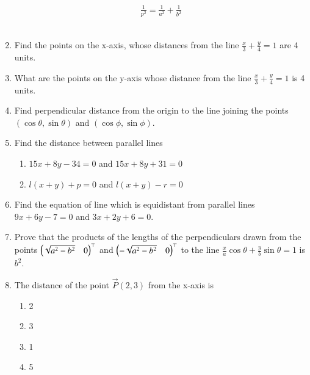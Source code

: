 \begin{enumerate}[label=\thesubsection.\arabic*,ref=\thesubsection.\theenumi]
\begin{align}
	\frac{1}{p^2} = \frac{1}{a^2}+ \frac{1}{b^2}
\label{eq:11/10/3/18}
\end{align}
\label{chapters/11/10/3/18}
\\
\solution

\item Find the points on the x-axis, whose distances from the line $\frac{x}{3}+\frac{y}{4}=1$ are 4 units.
\label{chapters/11/10/3/5}
	\\
	\solution

\item What are the points on the y-axis whose distance from the line $\frac{x}{3}+\frac{y}{4}=1$ is 4 units.
\\
\solution
		
\item Find perpendicular distance from the origin to the line joining the points $(\cos\theta,\sin\theta)$ and $(\cos\phi,\sin\phi)$.
\\
\solution
		
\item Find the distance between parallel lines
\label{chapters/11/10/3/6}
\begin{enumerate}
	\item $15x+8y-34=0$ and  $15x+8y+31=0$ \\
	\item  $l(x+y)+p=0$ and  $l(x+y)-r=0$
\end{enumerate}
	\solution

\item Find the equation of line which is equidistant from parallel lines $9x+6y-7=0$ and $3x+2y+6=0$.
\\
\solution
		
	\item Prove that the products of the lengths of the perpendiculars drawn from the points $\begin{pmatrix}\sqrt{a^2-b^2}& 0\end{pmatrix}^{\top}$ and $\begin{pmatrix}-\sqrt{a^2-b^2} &0\end{pmatrix}^{\top}$ to the line $\frac{x}{a} \cos{\theta} + \frac{y}{b}\sin{\theta} =1 $ is $ b^2 $.
\\
    \solution 
		
	\item The distance of the point $\vec{P}(2, 3)$ from the x-axis is

\begin{enumerate}
\item 2
\item 3
\item 1
\item 5 
\end{enumerate}


\end{enumerate}
